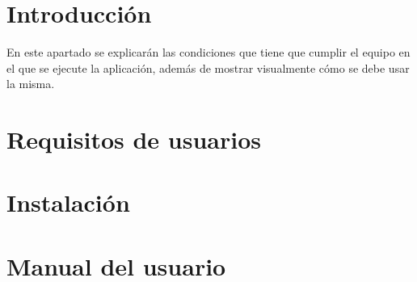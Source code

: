 
\section{Introducción}
En este apartado se explicarán las condiciones que tiene que cumplir el equipo en el que se ejecute la aplicación, además de mostrar visualmente cómo se debe usar la misma.

\section{Requisitos de usuarios}



\section{Instalación}

\section{Manual del usuario}


